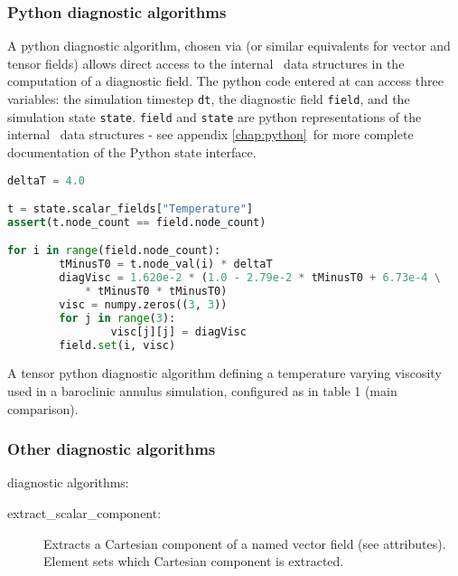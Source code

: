 \subsubsection{Python diagnostic algorithms}

A python diagnostic algorithm, chosen via 
(or similar equivalents for vector and tensor fields) allows direct access to the
internal \fluidity\ data structures in the computation of a diagnostic field. The
python code entered at 
can access three variables: the simulation timestep \lstinline[language = Python]*dt*,
the diagnostic field \lstinline[language = Python]*field*, and the simulation state
\lstinline[language = Python]*state*. \lstinline[language = Python]*field* and
\lstinline[language = Python]*state* are python representations of the internal
\fluidity\ data structures - see appendix \ref{chap:python}\ for more
complete documentation of the Python state interface.

\begin{example}
\begin{lstlisting}[language = Python]
deltaT = 4.0

t = state.scalar_fields["Temperature"]
assert(t.node_count == field.node_count)

for i in range(field.node_count):
        tMinusT0 = t.node_val(i) * deltaT
        diagVisc = 1.620e-2 * (1.0 - 2.79e-2 * tMinusT0 + 6.73e-4 \
            * tMinusT0 * tMinusT0)
        visc = numpy.zeros((3, 3))
        for j in range(3):
                visc[j][j] = diagVisc
        field.set(i, visc)
\end{lstlisting}
\caption{A tensor python diagnostic algorithm defining a temperature varying
         viscosity used in a baroclinic annulus simulation, configured
         as in \citet{hignett1985} table 1 (main comparison).}
\end{example}

\subsubsection{Other diagnostic algorithms}

 diagnostic algorithms:

\begin{description}
\item[extract\_scalar\_component:] Extracts a Cartesian component of a
  named vector field (see attributes). Element \option{component} sets
  which Cartesian component is extracted.
\end{description}


